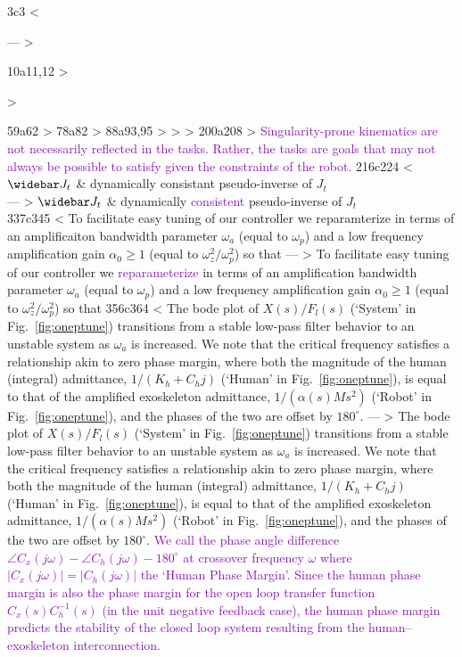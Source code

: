3c3
< \usepackage{url,hyperref,lineno,microtype,subcaption}
---
> \usepackage{url,lineno,microtype,subcaption}
10a11,12
> \usepackage[hidelinks]{hyperref}
> \usepackage[T1]{fontenc}
59a62
> 
78a82
> 
88a93,95
> 
> \newcommand{\add}[1]{\textcolor[HTML]{8710b3}{#1}}
> 
200a208
> \add{Singularity-prone kinematics are not necessarily reflected in the tasks. Rather, the tasks are goals that may not always be possible to satisfy given the constraints of the robot.}
216c224
< 		$\widebar J_t$ & dynamically consistant pseudo-inverse of $J_t$\\
---
> 		$\widebar J_t$ & dynamically \add{consistent} pseudo-inverse of $J_t$\\
337c345
< To facilitate easy tuning of our controller we reparamterize in terms of an amplificaiton bandwidth parameter $\omega_a$ (equal to $\omega_p$) and a low frequency amplification gain $\alpha_0\geq1$ (equal to $\omega_z^2/\omega_p^2$) so that
---
> To facilitate easy tuning of our controller we \add{reparameterize} in terms of an amplification bandwidth parameter $\omega_a$ (equal to $\omega_p$) and a low frequency amplification gain $\alpha_0\geq1$ (equal to $\omega_z^2/\omega_p^2$) so that
356c364
< The bode plot of $X(s)/F_l(s)$ (`System' in Fig.~\ref{fig:oneptune}) transitions from a stable low-pass filter behavior to an unstable system as $\omega_a$ is increased. We note that the critical frequency satisfies a relationship akin to zero phase margin, where both the magnitude of the human (integral) admittance, $1/(K_h+C_hj)$ (`Human' in Fig.~\ref{fig:oneptune}), is equal to that of the amplified exoskeleton admittance, $1/(\alpha(s)Ms^2)$ (`Robot' in Fig.~\ref{fig:oneptune}), and the phases of the two are offset by $180^\circ$. 
---
> The bode plot of $X(s)/F_l(s)$ (`System' in Fig.~\ref{fig:oneptune}) transitions from a stable low-pass filter behavior to an unstable system as $\omega_a$ is increased. We note that the critical frequency satisfies a relationship akin to zero phase margin, where both the magnitude of the human (integral) admittance, $1/(K_h+C_hj)$ (`Human' in Fig.~\ref{fig:oneptune}), is equal to that of the amplified exoskeleton admittance, $1/(\alpha(s)Ms^2)$ (`Robot' in Fig.~\ref{fig:oneptune}), and the phases of the two are offset by $180^\circ$. \add{We call the phase angle difference $\angle C_x(j\omega)-\angle C_h(j\omega)-180^\circ$ at crossover frequency $\omega$ where $|C_x(j\omega)|=|C_h(j\omega)|$ the `Human Phase Margin'. Since the human phase margin is also the phase margin for the open loop transfer function $C_x(s)C_h^{-1}(s)$ (in the unit negative feedback case), the human phase margin predicts the stability of the closed loop system resulting from the human--exoskeleton interconnection.}
